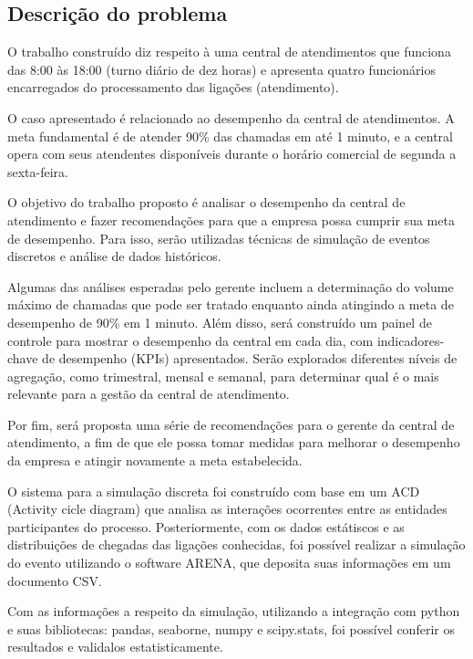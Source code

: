 \subsection{Descrição do problema}
\label{section: descricao}
O trabalho construído diz respeito à uma central de atendimentos que funciona das 8:00 às 18:00 (turno diário de dez horas) e apresenta quatro funcionários encarregados do processamento das ligações (atendimento).

O caso apresentado é relacionado ao desempenho da central de atendimentos. A meta fundamental é de atender 90\% das chamadas em até 1 minuto, e a central opera com seus atendentes disponíveis durante o horário comercial de segunda a sexta-feira.

O objetivo do trabalho proposto é analisar o desempenho da central de atendimento e fazer recomendações para que a empresa possa cumprir sua meta de desempenho. Para isso, serão utilizadas técnicas de simulação de eventos discretos e análise de dados históricos.

Algumas das análises esperadas pelo gerente incluem a determinação do volume máximo de chamadas que pode ser tratado enquanto ainda atingindo a meta de desempenho de 90\% em 1 minuto. Além disso, será construído um painel de controle para mostrar o desempenho da central em cada dia, com indicadores-chave de desempenho (KPIs) apresentados. Serão explorados diferentes níveis de agregação, como trimestral, mensal e semanal, para determinar qual é o mais relevante para a gestão da central de atendimento.

Por fim, será proposta uma série de recomendações para o gerente da central de atendimento, a fim de que ele possa tomar medidas para melhorar o desempenho da empresa e atingir novamente a meta estabelecida.

O sistema para a simulação discreta foi construído com base em um ACD (Activity cicle diagram) que analisa as interações ocorrentes entre as entidades participantes do processo. Posteriormente, com os dados estátiscos e as distribuições de chegadas das ligações conhecidas, foi possível realizar a simulação do evento utilizando o software ARENA, que deposita suas informações em um documento CSV. 

Com as informações a respeito da simulação, utilizando a integração com python e suas bibliotecas: pandas, seaborne, numpy e scipy.stats, foi possível conferir os resultados e validalos estatisticamente.

